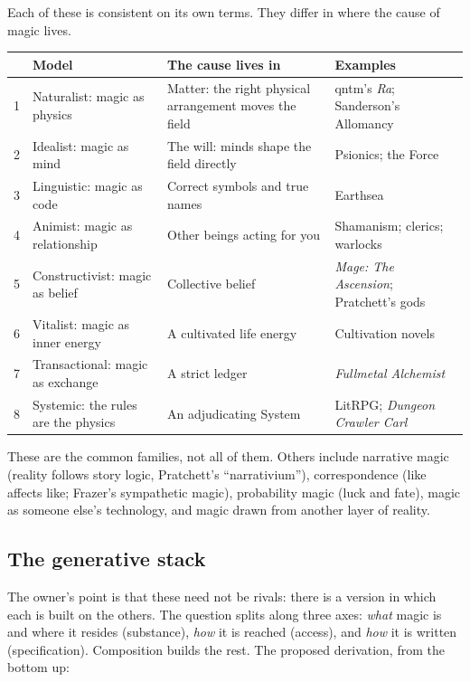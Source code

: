 \documentclass[11pt,a4paper]{article}
\begin{document}
Each of these is consistent on its own terms. They differ in where the cause of magic lives.

\begin{center}\small
\begin{tabularx}{\textwidth}{@{}l>{\raggedright\arraybackslash}p{}>{\raggedright\arraybackslash}X>{\raggedright\arraybackslash}p{}@{}}
\toprule
& \textbf{Model} & \textbf{The cause lives in} & \textbf{Examples}\\
\midrule
1 & Naturalist: magic as physics & Matter: the right physical arrangement moves the field & qntm's \emph{Ra}; Sanderson's Allomancy\\
2 & Idealist: magic as mind & The will: minds shape the field directly & Psionics; the Force\\
3 & Linguistic: magic as code & Correct symbols and true names & Earthsea\\
4 & Animist: magic as relationship & Other beings acting for you & Shamanism; clerics; warlocks\\
5 & Constructivist: magic as belief & Collective belief & \emph{Mage: The Ascension}; Pratchett's gods\\
6 & Vitalist: magic as inner energy & A cultivated life energy & Cultivation novels\\
7 & Transactional: magic as exchange & A strict ledger & \emph{Fullmetal Alchemist}\\
8 & Systemic: the rules are the physics & An adjudicating System & LitRPG; \emph{Dungeon Crawler Carl}\\
\bottomrule
\end{tabularx}
\end{center}

These are the common families, not all of them. Others include narrative magic (reality follows story logic, Pratchett's ``narrativium''), correspondence (like affects like; Frazer's sympathetic magic), probability magic (luck and fate), magic as someone else's technology, and magic drawn from another layer of reality.

\subsection{The generative stack}

The owner's point is that these need not be rivals: there is a version in which each is built on the others. The question splits along three axes: \emph{what} magic is and where it resides (substance), \emph{how} it is reached (access), and \emph{how} it is written (specification). Composition builds the rest. The proposed derivation, from the bottom up:
\end{document}
